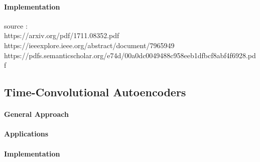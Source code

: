 \documentclass[11pt]{article}
\begin{document}
\paragraph{Implementation} 

source : \\
https://arxiv.org/pdf/1711.08352.pdf \\
https://ieeexplore.ieee.org/abstract/document/7965949 \\
https://pdfs.semanticscholar.org/e74d/00a0dc0049488c958eeb1dfbcf8abf4f6928.pdf \\

\subsection{Time-Convolutional Autoencoders}
\paragraph{General Approach}
\paragraph{Applications}
\paragraph{Implementation}
\end{document}
